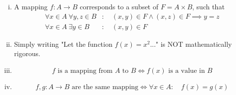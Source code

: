 \documentclass[../../script.tex]{subfiles}
\begin{document}
\begin{rem}\leavevmode
\begin{enumerate}[(i)]
	\item A mapping $f: A \rightarrow B$ corresponds to a subset of $F = A \times B$, such that
	\begin{align*}
		\forall x \in A ~\forall y, z \in B&: \quad (x, y) \in F \wedge (x, z) \in F \implies y = z \\
		\forall x \in A ~\exists y \in B&: \quad (x, y) \in F
	\end{align*}
	\item Simply writing "Let the function $f(x) = x^2$..." is NOT mathematically rigorous.
	\item 
	\[
		f \text{ is a mapping from } A \text{ to } B \iff f(x) \text{ is a value in } B
	\]
	\item 
	\[
		f, g: A \longrightarrow B \text{ are the same mapping} \iff \forall x \in A: \quad f(x) = g(x)
	\]
\end{enumerate}
\end{rem}
\end{document}

